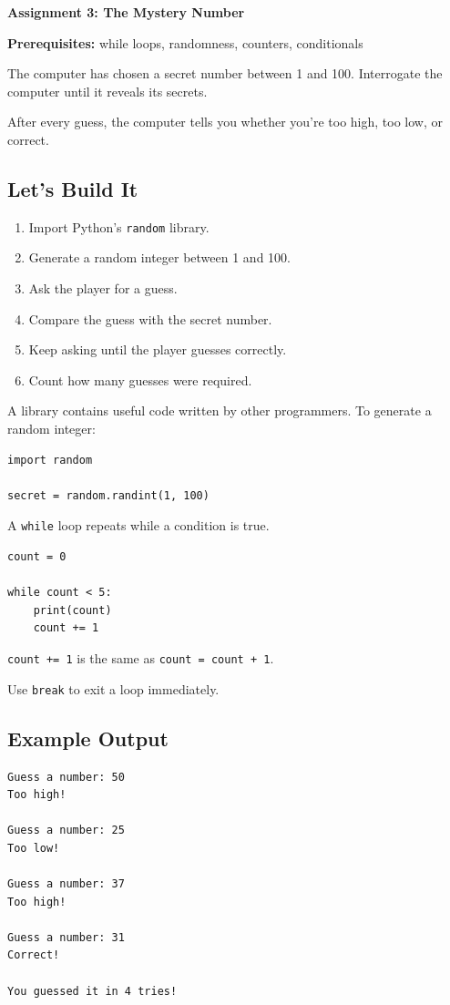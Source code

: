 \documentclass[11pt,letterpaper]{article}
\newcommand{\assignment}[3]{
    \clearpage
    {\Large\bfseries\color{navy} Assignment #1: #2}

    \vspace{2mm}
    {\small\color{darkgray}\textbf{Prerequisites:} #3}

    \vspace{3mm}
}
\newcommand{\steps}{\subsection*{Let's Build It}}
\newcommand{\exampleoutput}{\subsection*{Example Output}}
\begin{document}
\assignment{3}{The Mystery Number}
{while loops, randomness, counters, conditionals}

\begin{missionbox}
The computer has chosen a secret number between 1 and 100. Interrogate the computer until it reveals its secrets.

After every guess, the computer tells you whether you're too high, too low, or correct.
\end{missionbox}

\steps

\begin{enumerate}
    \item Import Python's \texttt{random} library.
    \item Generate a random integer between 1 and 100.
    \item Ask the player for a guess.
    \item Compare the guess with the secret number.
    \item Keep asking until the player guesses correctly.
    \item Count how many guesses were required.
\end{enumerate}

\begin{hintbox}
A library contains useful code written by other programmers.
To generate a random integer:
\begin{lstlisting}
import random

secret = random.randint(1, 100)
\end{lstlisting}

A \texttt{while} loop repeats while a condition is true.

\begin{lstlisting}
count = 0

while count < 5:
    print(count)
    count += 1
\end{lstlisting}

\texttt{count += 1} is the same as \texttt{count = count + 1}.

Use \texttt{break} to exit a loop immediately.
\end{hintbox}

\exampleoutput

\begin{lstlisting}[style=outputstyle]
Guess a number: 50
Too high!

Guess a number: 25
Too low!

Guess a number: 37
Too high!

Guess a number: 31
Correct!

You guessed it in 4 tries!
\end{lstlisting}
\end{document}
